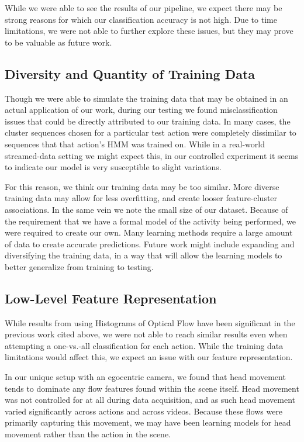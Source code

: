 \documentclass[10pt,twocolumn,letterpaper]{article}
\begin{document}
While we were able to see the results of our pipeline, we expect there may be strong reasons for which our classification accuracy is not high. Due to time limitations, we were not able to further explore these issues, but they may prove to be valuable as future work.

\subsection{Diversity and Quantity of Training Data}

Though we were able to simulate the training data that may be obtained in an actual application of our work, during our testing we found misclassification issues that could be directly attributed to our training data. In many cases, the cluster sequences chosen for a particular test action were completely dissimilar to sequences that that action's HMM was trained on. While in a real-world streamed-data setting we might expect this, in our controlled experiment it seems to indicate our model is very susceptible to slight variations.

For this reason, we think our training data may be too similar. More diverse training data may allow for less overfitting, and create looser feature-cluster associations. In the same vein we note the small size of our dataset. Because of the requirement that we have a formal model of the activity being performed, we were required to create our own. Many learning methods require a large amount of data to create accurate predictions. Future work might include expanding and diversifying the training data, in a way that will allow the learning models to better generalize from training to testing.

\subsection{Low-Level Feature Representation}

While results from using Histograms of Optical Flow have been significant in the previous work cited above, we were not able to reach similar results even when attempting a one-vs.-all classification for each action. While the training data limitations would affect this, we expect an issue with our feature representation.

In our unique setup with an egocentric camera, we found that head movement tends to dominate any flow features found within the scene itself. Head movement was not controlled for at all during data acquisition, and as such head movement varied significantly across actions and across videos. Because these flows were primarily capturing this movement, we may have been learning models for head movement rather than the action in the scene.
\end{document}
